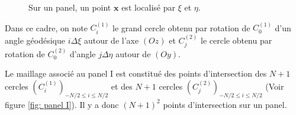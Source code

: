 \begin{figure}[htbp]
\begin{center}
\end{center}
\caption{Sur un panel, un point $\mathbf{x}$ est localisé par $\xi$ et $\eta$.}
\label{fig: panel I xi eta}
\end{figure}


Dans ce cadre, on note $C^{(1)}_i$ le grand cercle obtenu par rotation de $C^{(1)}_0$ d'un angle géodésique $i \Delta \xi$ autour de l'axe $(Oz)$ et $C^{(2)}_j$ le cercle obtenu par rotation de $C^{(2)}_0$ d'angle $j \Delta \eta$ autour de $(Oy)$.

Le maillage associé au panel I est constitué des points d'intersection des $N+1$ cercles $( C_i^{(1)} )_{-N/2 \leq i \leq N/2}$ et des $N+1$ cercles $(C_j^{(2)})_{-N/2 \leq i \leq N/2}$ (Voir figure \ref{fig: panel I}). Il y a donc $(N+1)^2$ points d'intersection sur un panel.

